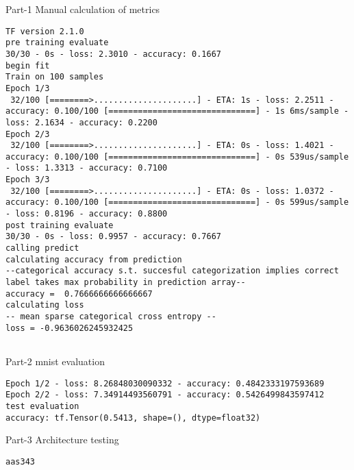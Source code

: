 \documentclass[11pt,a4paper]{article}
\begin{document}
Part-1 Manual calculation of metrics\\

\begin{verbatim}
TF version 2.1.0
pre training evaluate
30/30 - 0s - loss: 2.3010 - accuracy: 0.1667
begin fit
Train on 100 samples
Epoch 1/3
 32/100 [========>.....................] - ETA: 1s - loss: 2.2511 - accuracy: 0.100/100 [==============================] - 1s 6ms/sample - loss: 2.1634 - accuracy: 0.2200
Epoch 2/3
 32/100 [========>.....................] - ETA: 0s - loss: 1.4021 - accuracy: 0.100/100 [==============================] - 0s 539us/sample - loss: 1.3313 - accuracy: 0.7100
Epoch 3/3
 32/100 [========>.....................] - ETA: 0s - loss: 1.0372 - accuracy: 0.100/100 [==============================] - 0s 599us/sample - loss: 0.8196 - accuracy: 0.8800
post training evaluate
30/30 - 0s - loss: 0.9957 - accuracy: 0.7667
calling predict
calculating accuracy from prediction
--categorical accuracy s.t. succesful categorization implies correct label takes max probability in prediction array--
accuracy =  0.7666666666666667
calculating loss
-- mean sparse categorical cross entropy --
loss = -0.9636026245932425


\end{verbatim}

Part-2 mnist evaluation\\

\begin{verbatim}
Epoch 1/2 - loss: 8.26848030090332 - accuracy: 0.4842333197593689
Epoch 2/2 - loss: 7.34914493560791 - accuracy: 0.5426499843597412
test evaluation
accuracy: tf.Tensor(0.5413, shape=(), dtype=float32)

\end{verbatim}

Part-3 Architecture testing
\begin{verbatim}
aas343
\end{verbatim}
\end{document}
